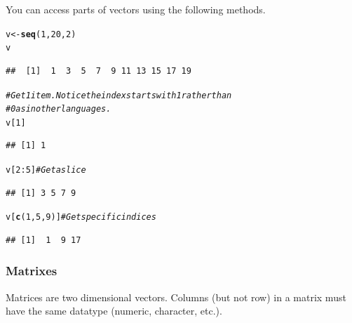 \documentclass{article}\usepackage[]{graphicx}\usepackage[]{color}
\makeatletter
\newcommand{\hlnum}[1]{\textcolor[rgb]{0.686,0.059,0.569}{#1}}%
\newcommand{\hlcom}[1]{\textcolor[rgb]{0.678,0.584,0.686}{\textit{#1}}}%
\newcommand{\hlopt}[1]{\textcolor[rgb]{0,0,0}{#1}}%
\newcommand{\hlstd}[1]{\textcolor[rgb]{0.345,0.345,0.345}{#1}}%
\newcommand{\hlkwb}[1]{\textcolor[rgb]{0.69,0.353,0.396}{#1}}%
\newcommand{\hlkwd}[1]{\textcolor[rgb]{0.737,0.353,0.396}{\textbf{#1}}}%
\newenvironment{kframe}{%
 \def\at@end@of@kframe{}%
 \ifinner\ifhmode%
  \def\at@end@of@kframe{\end{minipage}}%
  \begin{minipage}{\columnwidth}%
 \fi\fi%
 \def\FrameCommand##1{\hskip\@totalleftmargin \hskip-\fboxsep
 \colorbox{shadecolor}{##1}\hskip-\fboxsep
     \hskip-\linewidth \hskip-\@totalleftmargin \hskip\columnwidth}%
 \MakeFramed {\advance\hsize-\width
   \@totalleftmargin\z@ \linewidth\hsize
   \@setminipage}}%
 {\par\unskip\endMakeFramed%
 \at@end@of@kframe}
\newenvironment{knitrout}{}{} %
\makeatother
\begin{document}
    You can access parts of vectors using the following methods.
    
\begin{knitrout}
\color{fgcolor}\begin{kframe}
\begin{alltt}
  \hlstd{v} \hlkwb{<-} \hlkwd{seq}\hlstd{(}\hlnum{1}\hlstd{,} \hlnum{20}\hlstd{,} \hlnum{2}\hlstd{)}
  \hlstd{v}
\end{alltt}
\begin{verbatim}
##  [1]  1  3  5  7  9 11 13 15 17 19
\end{verbatim}
\begin{alltt}
  \hlcom{# Get 1 item. Notice the index starts with 1 rather than}
  \hlcom{# 0 as in other languages.}
  \hlstd{v[}\hlnum{1}\hlstd{]}
\end{alltt}
\begin{verbatim}
## [1] 1
\end{verbatim}
\begin{alltt}
  \hlstd{v[}\hlnum{2}\hlopt{:}\hlnum{5}\hlstd{]}  \hlcom{# Get a slice}
\end{alltt}
\begin{verbatim}
## [1] 3 5 7 9
\end{verbatim}
\begin{alltt}
  \hlstd{v[}\hlkwd{c}\hlstd{(}\hlnum{1}\hlstd{,} \hlnum{5}\hlstd{,} \hlnum{9}\hlstd{)]}  \hlcom{# Get specific indices}
\end{alltt}
\begin{verbatim}
## [1]  1  9 17
\end{verbatim}
\end{kframe}
\end{knitrout}
    
    \subsubsection*{Matrixes}
    Matrices are two dimensional vectors. Columns (but not row) in a matrix must have the same datatype (numeric, character, etc.).
    
\end{document}
